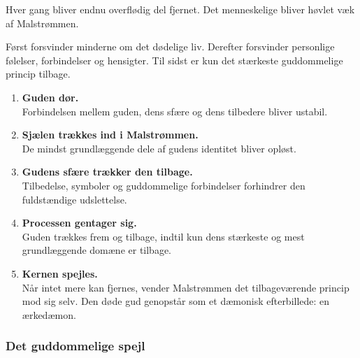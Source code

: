 \documentclass[a4paper,12pt]{memoir}
\begin{document}
Hver gang bliver endnu overflødig del fjernet. Det menneskelige bliver høvlet væk af Malstrømmen.

Først forsvinder minderne om det dødelige liv. Derefter
forsvinder personlige følelser, forbindelser og hensigter.
Til sidst er kun det stærkeste guddommelige princip tilbage.

\begin{tcolorbox}[
  enhanced,
  colback=black!3,
  colframe=Maroon!85!black,
  boxrule=1pt,
  borderline west={3pt}{0pt}{Maroon!85!black},
  sharp corners,
  title={\sffamily\bfseries KRELLS MODEL FOR DEN GUDDOMMELIGE OPLØSNING},
  colbacktitle=Maroon!90!black,
  coltitle=white,
  fontupper=\small,
  left=4mm,
  right=4mm,
  top=3mm,
  bottom=3mm
]

\begin{enumerate}
  \setlength{\itemsep}{0.4em}

  \item \textbf{Guden dør.}\\
  Forbindelsen mellem guden, dens sfære og dens tilbedere
  bliver ustabil.

  \item \textbf{Sjælen trækkes ind i Malstrømmen.}\\
  De mindst grundlæggende dele af gudens identitet bliver
  opløst.

  \item \textbf{Gudens sfære trækker den tilbage.}\\
  Tilbedelse, symboler og guddommelige forbindelser
  forhindrer den fuldstændige udslettelse.

  \item \textbf{Processen gentager sig.}\\
  Guden trækkes frem og tilbage, indtil kun dens stærkeste
  og mest grundlæggende domæne er tilbage.

  \item \textbf{Kernen spejles.}\\
  Når intet mere kan fjernes, vender Malstrømmen det
  tilbageværende princip mod sig selv. Den døde gud
  genopstår som et dæmonisk efterbillede: en ærkedæmon.
\end{enumerate}

\end{tcolorbox}

\subsubsection*{Det guddommelige spejl}
\end{document}
